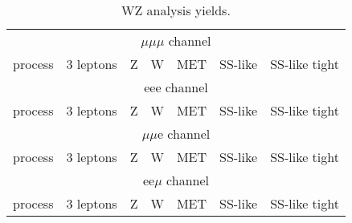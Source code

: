 \documentclass[a4paper]{article}
\begin{document}
\begin{table}[ht]
\begin{center}
\begin{tabular}{l|r|r|r|r|r|r}
\hline
\multicolumn{7}{c}{$\mu\mu\mu$ channel}\\
process & 3 leptons & Z & W & MET & SS-like & SS-like tight\\
\hline

\hline
\hline
\multicolumn{7}{c}{eee channel}\\
process & 3 leptons & Z & W & MET & SS-like & SS-like tight\\
\hline

\hline
\hline
\multicolumn{7}{c}{$\mu\mu$e channel}\\
process & 3 leptons & Z & W & MET & SS-like & SS-like tight\\
\hline

\hline
\hline
\multicolumn{7}{c}{ee$\mu$ channel}\\
process & 3 leptons & Z & W & MET & SS-like & SS-like tight\\
\hline

\hline
\end{tabular}
\caption{WZ analysis yields.}
\label{tab:wz_yields}
\end{center}
\end{table}
\end{document}
